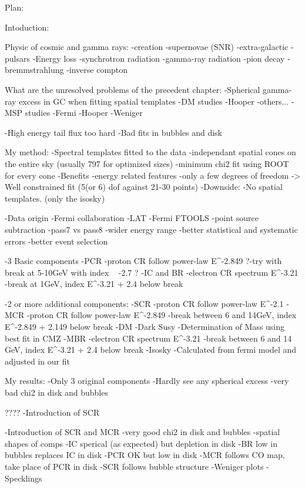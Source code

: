 Plan:

Intoduction:

Physic of cosmic and gamma rays:
	-creation
		-supernovae (SNR)
		-extra-galactic
		-pulsars
	-Energy loss
		-synchrotron radiation		
		-gamma-ray radiation
			-pion decay
			-bremmstrahlung
			-inverse compton

What are the unresolved problems of the precedent chapter:
	-Spherical gamma-ray excess in GC when fitting spatial templates
		-DM studies
			-Hooper
			-others...
		-MSP studies
			-Fermi
			-Hooper
			-Weniger

	-High energy tail flux too hard
	-Bad fits in bubbles and disk
	
	
My method:
	-Spectral templates fitted to the data
		-independant spatial cones on the entire sky (usually 797 for optimized sizes)
		-minimum chi2 fit using ROOT for every cone
		-Benefits
			-energy related features
			-only a few degrees of freedom -> Well constrained fit (5(or 6) dof against 21-30 points)
		-Downside:
			-No spatial templates. (only the isosky)
			
	
	-Data origin
		-Fermi collaboration
		-LAT
		-Fermi FTOOLS
		-point source subtraction
		-pass7 vs pass8
			-wider energy range
			-better statistical and systematic errors
			-better event selection
		

	-3 Basic components
		-PCR
			-proton CR follow power-law E^-2.849
			?-try with break at 5-10GeV with index ~ -2.7 ?
		-IC and BR
			-electron CR spectrum E^-3.21
			-break at 1GeV, index E^-3.21 + 2.4 below break
		
	
	-2 or more additional components:
		-SCR
			-proton CR follow power-law E^-2.1
		-MCR
			-proton CR follow power-law E^-2.849
			-break between 6 and 14GeV, index E^-2.849 + 2.149 below break
		-DM
			-Dark Susy
			-Determination of Mass using best fit in CMZ
		-MBR
			-electron CR spectrum E^-3.21
			-break between 6 and 14 GeV, index E^-3.21 + 2.4 below break
	-Isosky
		-Calculated from fermi model and adjusted in our fit




My results:
	-Only 3 original components
		-Hardly see any spherical excess
		-very bad chi2 in disk and bubbles

????	-Introduction of SCR
	
	
	-Introduction of SCR and MCR
		-very good chi2 in disk and bubbles
		-spatial shapes of comps
			-IC sperical (as expected) but depletion in disk
			-BR low in bubbles replaces IC in disk
			-PCR OK but low in disk
			-MCR follows CO map, take place of PCR in disk
			-SCR follows bubble structure
		-Weniger plots
		-Specklings

